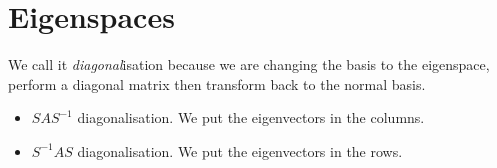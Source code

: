 \chapter{Eigenspaces}


We call it \textit{diagonal}isation because we are changing the basis to 
the eigenspace, perform a diagonal matrix then transform back to the normal basis. 

\begin{itemize}
\item $SAS^{-1}$ diagonalisation. We put the eigenvectors in the columns. 
\item $S^{-1}AS$ diagonalisation.  We put the eigenvectors in the rows. 
\end{itemize}